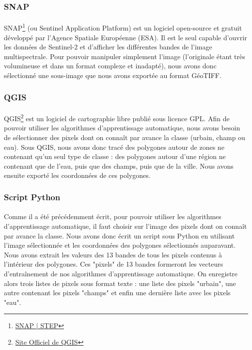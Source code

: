 \documentclass[a4paper,10pt]{report}
\begin{document}
\subsubsection{SNAP}
\paragraph{}
SNAP\footnote{\href{http://step.esa.int/main/toolboxes/snap/}{SNAP | STEP}} (ou Sentinel Application Platform) est un logiciel open-source et gratuit développé par l'Agence Spatiale Européenne (ESA). Il est le seul capable d'ouvrir les données de Sentinel-2 et d'afficher les différentes bandes de l'image multispectrale. Pour pouvoir manipuler simplement l'image (l'originale étant très volumineuse et dans un format complexe et inadapté), nous avons donc sélectionné une sous-image que nous avons exportée au format GéoTIFF.
\subsubsection{QGIS}
\paragraph{}
QGIS\footnote{\href{http://www.qgis.org}{Site Officiel de QGIS}} est un logiciel de cartographie libre publié sous licence GPL. Afin de pouvoir utiliser les algorithmes d'apprentissage automatique, nous avons besoin de sélectionner des pixels dont on connaît par avance la classe (urbain, champ ou eau). Sous QGIS, nous avons donc tracé des polygones autour de zones ne contenant qu'un seul type de classe : des polygones autour d'une région ne contenant que de l'eau, puis que des champs, puis que de la ville. Nous avons ensuite exporté les coordonnées de ces polygones.
\subsubsection{Script Python}
\paragraph{}
Comme il a été précédemment écrit, pour pouvoir utiliser les algorithmes d'apprentissage automatique, il faut choisir sur l'image des pixels dont on connaît par avance la classe. Nous avons donc écrit un script sous Python en utilisant l'image sélectionnée et les coordonnées des polygones sélectionnés auparavant. Nous avons extrait les valeurs des 13 bandes de tous les pixels contenus à l'intérieur des polygones. Ces "pixels" de 13 bandes formeront les vecteurs d'entraînement de nos algorithmes d'apprentissage automatique. On enregistre alors trois listes de pixels sous format texte : une liste des pixels "urbain", une autre contenant les pixels "champs" et enfin une dernière liste avec les pixels "eau".
\end{document}
